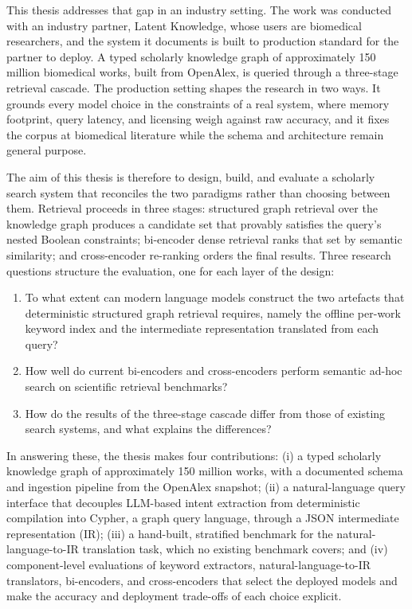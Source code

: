This thesis addresses that gap in an industry setting. The work was conducted with an industry partner, Latent Knowledge, whose users are biomedical researchers, and the system it documents is built to production standard for the partner to deploy. A typed scholarly knowledge graph of approximately 150 million biomedical works, built from OpenAlex, is queried through a three-stage retrieval cascade. The production setting shapes the research in two ways. It grounds every model choice in the constraints of a real system, where memory footprint, query latency, and licensing weigh against raw accuracy, and it fixes the corpus at biomedical literature while the schema and architecture remain general purpose.
 
The aim of this thesis is therefore to design, build, and evaluate a scholarly search system that reconciles the two paradigms rather than choosing between them. Retrieval proceeds in three stages: structured graph retrieval over the knowledge graph produces a candidate set that provably satisfies the query's nested Boolean constraints; bi-encoder dense retrieval ranks that set by semantic similarity; and cross-encoder re-ranking orders the final results. Three research questions structure the evaluation, one for each layer of the design:
 
\begin{enumerate}
    \item To what extent can modern language models construct the two artefacts that deterministic structured graph retrieval requires, namely the offline per-work keyword index and the intermediate representation translated from each query?
    \item How well do current bi-encoders and cross-encoders perform semantic ad-hoc search on scientific retrieval benchmarks?
    \item How do the results of the three-stage cascade differ from those of existing search systems, and what explains the differences?
\end{enumerate}
 
In answering these, the thesis makes four contributions: (i) a typed scholarly knowledge graph of approximately 150 million works, with a documented schema and ingestion pipeline from the OpenAlex snapshot; (ii) a natural-language query interface that decouples LLM-based intent extraction from deterministic compilation into Cypher, a graph query language, through a JSON intermediate representation (IR); (iii) a hand-built, stratified benchmark for the natural-language-to-IR translation task, which no existing benchmark covers; and (iv) component-level evaluations of keyword extractors, natural-language-to-IR translators, bi-encoders, and cross-encoders that select the deployed models and make the accuracy and deployment trade-offs of each choice explicit.
 
